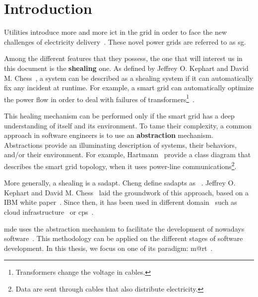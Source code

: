 \section{Introduction}

Utilities introduce more and more \gls{ict} in the grid in order to face the new challenges of electricity delivery~\cite{farhangi2010path, ipakchi2009grid, DBLP:journals/comsur/FangMXY12}.
These novel power grids are referred to as \gls{sg}.

Among the different features that they possess, the one that will interest us in this document is the \textbf{\gls{shealing}} one.
As defined by Jeffrey O. Kephart and David M. Chess~\cite{DBLP:journals/computer/KephartC03}, a system can be described as a \gls{shealing} system if it can automatically fix any incident at runtime.
For example, a smart grid can automatically optimize the power flow in order to deal with failures of transformers\footnote{Transformers change the voltage in cables.}~\cite{DBLP:journals/comsur/FangMXY12}.

This healing mechanism can be performed only if the smart grid has a deep understanding of itself and its environment.
To tame their complexity, a common approach in software engineers is to use an \textbf{abstraction} mechanism.
Abstractions provide an illuminating description of systems, their behaviors, and/or their environment.
For example, Hartmann~\etal \cite{DBLP:conf/smartgridcomm/0001FKTPTR14} provide a class diagram that describes the smart grid topology, when it uses power-line communications\footnote{Data are sent through cables that also distribute electricity.}.

\bigskip

More generally, a \gls{shealing} is a \gls{sadapt}. 
Cheng \etal define \glspl{sadapt} as ~\cite{DBLP:conf/dagstuhl/ChengLGIMABBBCSDFGGGKKKLMMMPSTTWW09}.
Jeffrey O. Kephart and David M. Chess~\cite{DBLP:journals/computer/KephartC03} laid the groundwork of this approach, based on a IBM white paper~\cite{computing2006architectural}.
Since then, it has been used in different domain~\cite{DBLP:journals/corr/abs-1904-01518} such as cloud infrastructure~\cite{DBLP:conf/icac/JavadiG17, OpenStack:Watcher:Wiki, DBLP:conf/icse/BarnaKFL17} or \gls{cps}~\cite{DBLP:conf/icac/LalandaGC17, DBLP:conf/cbse/FouquetMFBPJ12, DBLP:conf/smartgridsec/0001FKNT14}.

\Gls{mde} uses the abstraction mechanism to facilitate the development of nowadays software~\cite{DBLP:journals/computer/Schmidt06, DBLP:conf/ifm/Kent02, DBLP:series/synthesis/2017Brambilla}.
This methodology can be applied on the different stages of software development.
In this thesis, we focus on one of its paradigm: \gls{m@rt}~\cite{DBLP:journals/computer/BlairBF09, DBLP:journals/computer/MorinBJFS09}.












